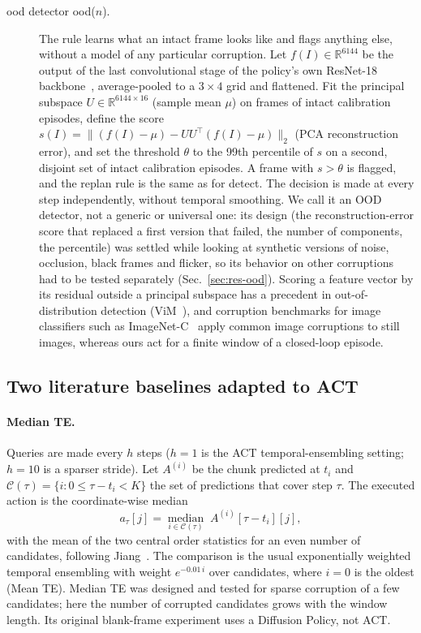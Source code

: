 \documentclass[11pt]{article}
\newcommand{\detect}{\textsf{detect}\xspace}
\newcommand{\ood}{\textsf{ood}\xspace}
\begin{document}
\begin{description}
  \item[\ood detector \ood($n$).] The rule learns what an intact frame looks like and flags anything else, without a model of any particular corruption. Let $f(I)\in\mathbb R^{6144}$ be the output of the last convolutional stage of the policy's own ResNet-18 backbone~\cite{he2016resnet}, average-pooled to a $3\times4$ grid and flattened. Fit the principal subspace $U\in\mathbb R^{6144\times16}$ (sample mean $\mu$) on frames of intact calibration episodes, define the score $s(I)=\lVert (f(I)-\mu)-UU^{\top}(f(I)-\mu)\rVert_2$ (PCA reconstruction error), and set the threshold $\theta$ to the 99th percentile of $s$ on a second, disjoint set of intact calibration episodes. A frame with $s>\theta$ is flagged, and the replan rule is the same as for \detect. The decision is made at every step independently, without temporal smoothing. We call it an OOD detector, not a generic or universal one: its design (the reconstruction-error score that replaced a first version that failed, the number of components, the percentile) was settled while looking at synthetic versions of noise, occlusion, black frames and flicker, so its behavior on other corruptions had to be tested separately (Sec.~\ref{sec:res-ood}). Scoring a feature vector by its residual outside a principal subspace has a precedent in out-of-distribution detection (ViM~\cite{wang2022vim}), and corruption benchmarks for image classifiers such as ImageNet-C~\cite{hendrycks2019imagenetc} apply common image corruptions to still images, whereas ours act for a finite window of a closed-loop episode.
\end{description}

\subsection{Two literature baselines adapted to ACT}
\label{sec:baselines}
\paragraph{Median TE.} Queries are made every $h$ steps ($h=1$ is the ACT temporal-ensembling setting; $h=10$ is a sparser stride). Let $A^{(i)}$ be the chunk predicted at $t_i$ and $\mathcal C(\tau)=\{i:0\le\tau-t_i<K\}$ the set of predictions that cover step $\tau$. The executed action is the coordinate-wise median
\begin{equation}
  a_\tau[j]=\operatorname*{median}_{i\in\mathcal C(\tau)}\;A^{(i)}[\tau-t_i][j],
  \label{eq:mte}
\end{equation}
with the mean of the two central order statistics for an even number of candidates, following Jiang~\cite{jiang2026mte}. The comparison is the usual exponentially weighted temporal ensembling with weight $e^{-0.01\,i}$ over candidates, where $i{=}0$ is the oldest (Mean TE). Median TE was designed and tested for sparse corruption of a few candidates; here the number of corrupted candidates grows with the window length. Its original blank-frame experiment uses a Diffusion Policy, not ACT.
\end{document}
